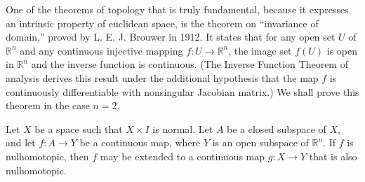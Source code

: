 One of the theorems of topology that is truly fundamental, because it expresses an intrinsic property of euclidean space, is the theorem on ``invariance of domain,'' proved by L. E. J. Brouwer in 1912. It states that for any open set \(U\) of \(\mathbb{R}^{n}\) and any continuous injective mapping \(f : U \rightarrow {\mathbb{R}}^{n}\), the image set \(f( U)\) is open in \(\mathbb{R}^{n}\) and the inverse function is continuous. (The Inverse Function Theorem of analysis derives this result under the additional hypothesis that the map \(f\) is continuously differentiable with nonsingular Jacobian matrix.) We shall prove this theorem in the case \(n = 2\).

\begin{lemma}
\label{lem:\thetheorem}
Let \(X\) be a space such that \(X \times I\) is normal. Let \(A\) be a closed subspace of \(X\), and let \(f : A \rightarrow Y\) be a continuous map, where \(Y\) is an open subspace of \(\mathbb{R}^{n}\). If \(f\) is nulhomotopic, then \(f\) may be extended to a continuous map \(g : X \rightarrow Y\) that is also nulhomotopic.
\end{lemma}

